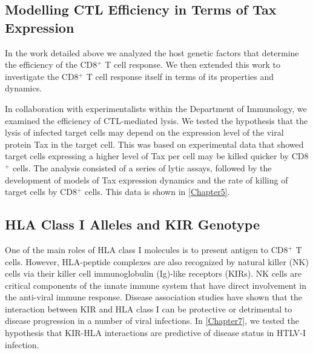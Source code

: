 \subsection{Modelling CTL Efficiency in Terms of Tax Expression}

In the work detailed above we analyzed the host genetic factors that determine the efficiency of the CD8$^+$ T cell response. We then extended this work to investigate the CD8$^+$ T cell response itself in terms of its properties and dynamics.

In collaboration with experimentalists within the Department of Immunology, we examined the efficiency of CTL-mediated lysis. We tested the hypothesis that the lysis of infected target cells may depend on the expression level of the viral protein Tax in the target cell. This was based on experimental data that showed target cells expressing a higher level of Tax per cell may be killed quicker by CD8$^+$ cells. The analysis consisted of a series of lytic assays, followed by the development of models of Tax expression dynamics and the rate of killing of target cells by CD8$^+$ cells. This data is shown in \cref{Chapter5}.

\subsection{HLA Class I Alleles and KIR Genotype}

One of the main roles of HLA class I molecules is to present antigen to CD8$^+$ T cells. However, HLA-peptide complexes are also recognized by natural killer (NK) cells via their killer cell immunoglobulin (Ig)-like receptors (KIRs). NK cells are critical components of the innate immune system that have direct involvement in the anti-viral immune response. Disease association studies have shown that the interaction between KIR and HLA class I can be protective or detrimental to disease progression in a number of viral infections. In \cref{Chapter7}, we tested the hypothesis that KIR-HLA interactions are predictive of disease status in HTLV-I infection.